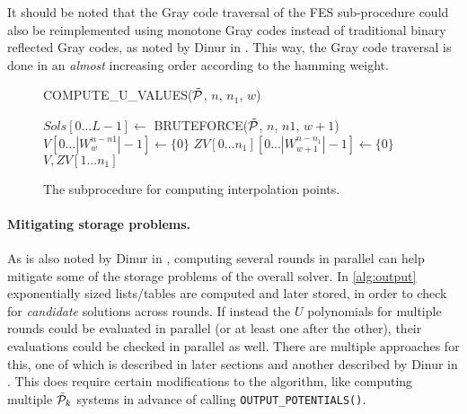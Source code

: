 It should be noted that the Gray code traversal of the FES sub-procedure could also be reimplemented using monotone Gray codes instead of traditional binary reflected Gray codes, as noted by Dinur in \cite{eurocrypt-2021-30841}. This way, the Gray code traversal is done in an \textit{almost} increasing order according to the hamming weight.

\begin{figure}[ht]
    \centering
    \begin{alg}
        \caption{COMPUTE\_U\_VALUES($\Tilde{\mathcal{P}}$, $n$, $n_1$, $w$)} \label{alg:uvalue}
        \label{alg:uvalues}
        $Sols[0\dots L - 1] \gets$ BRUTEFORCE($\Tilde{\mathcal{P}}$, $n$, $n1$, $w + 1$)\; \label{alg:uvalues:bruteforce}
        $V[0\dots |W^{n - n1}_w| - 1] \gets \{0\}$\;
        $ZV[0\dots n_1][0\dots |W^{n - n_1}_{w + 1}| - 1] \gets \{0\}$\;
        \Return $V, ZV[1\dots n_1]$\;
    \end{alg}
    \caption{The subprocedure for computing interpolation points.}
\end{figure}

\paragraph{Mitigating storage problems.} As is also noted by Dinur in \cite{eurocrypt-2021-30841}, computing several rounds in parallel can help mitigate some of the storage problems of the overall solver. In \cref{alg:output} exponentially sized lists/tables are computed and later stored, in order to check for \textit{candidate} solutions across rounds. If instead the $U$ polynomials for multiple rounds could be evaluated in parallel (or at least one after the other), their evaluations could be checked in parallel as well. There are multiple approaches for this, one of which is described in later sections and another described by Dinur in \cite{eurocrypt-2021-30841}. This does require certain modifications to the algorithm, like computing multiple $\Tilde{\mathcal{P}}_k$ systems in advance of calling \texttt{OUTPUT\_POTENTIALS()}. 

\newpage
